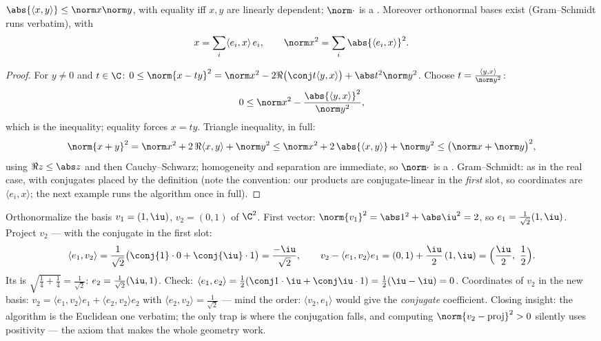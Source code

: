 \begin{theorem}\label{thm:b2:hermitian:cs}
$\abs{\langle x, y\rangle} \leq \norm x \norm y$, with equality iff
$x, y$ are linearly dependent; $\norm\cdot$ is a . Moreover
orthonormal bases exist (Gram--Schmidt runs verbatim), with
\[
x = \sum_i \langle e_i, x\rangle\, e_i,
\qquad
\norm x^2 = \sum_i \abs{\langle e_i, x\rangle}^2 .
\]
\end{theorem}

\begin{proof}
For $y \neq 0$ and $t \in \C$: $0 \leq \norm{x - ty}^2 = \norm x^2
- 2\Re\bigl(\conj t\langle y, x\rangle\bigr) + \abs t^2\norm y^2$.
Choose $t = \frac{\langle y, x\rangle}{\norm y^2}$:
\[
0 \leq \norm x^2 - \frac{\abs{\langle y, x\rangle}^2}{\norm y^2},
\]
which is the inequality; equality forces $x = ty$. Triangle
inequality, in full:
\[
\norm{x + y}^2 = \norm x^2 + 2\,\Re\langle x, y\rangle
+ \norm y^2
\leq \norm x^2 + 2\,\abs{\langle x, y\rangle} + \norm y^2
\leq \bigl(\norm x + \norm y\bigr)^2 ,
\]
using $\Re z \leq \abs z$ and then Cauchy--Schwarz; homogeneity
and separation are immediate, so $\norm\cdot$ is a .
Gram--Schmidt: as in the real case, with conjugates
placed by the definition (note the convention: our products are
conjugate-linear in the \emph{first} slot, so coordinates are
$\langle e_i, x\rangle$; the next example runs the algorithm
once in full).
\end{proof}

\begin{example}\label{ex:b2:hermitian:gramschmidt}
Orthonormalize the basis $v_1 = (1, \iu)$, $v_2 = (0, 1)$ of
$\C^2$. First vector: $\norm{v_1}^2 = \abs1^2 + \abs\iu^2 = 2$,
so $e_1 = \frac{1}{\sqrt2}(1, \iu)$. Project $v_2$ --- with the
conjugate in the first slot:
\[
\langle e_1, v_2\rangle
= \frac{1}{\sqrt2}\bigl(\conj{1}\cdot0 +
\conj{\iu}\cdot1\bigr)
= \frac{-\iu}{\sqrt2} ,
\qquad
v_2 - \langle e_1, v_2\rangle e_1
= (0,1) + \frac{\iu}{2}\,(1, \iu)
= \Bigl(\frac\iu2,\ \frac12\Bigr) .
\]
Its  is $\sqrt{\frac14 + \frac14} = \frac{1}{\sqrt2}$:
$e_2 = \frac{1}{\sqrt2}(\iu, 1)$. Check: $\langle e_1,
e_2\rangle = \frac12(\conj1\cdot\iu + \conj\iu\cdot1) =
\frac12(\iu - \iu) = 0$. Coordinates of $v_2$ in the new basis:
$v_2 = \langle e_1, v_2\rangle e_1 + \langle e_2, v_2\rangle
e_2$ with $\langle e_2, v_2\rangle = \frac{1}{\sqrt2}$ ---
mind the order: $\langle v_2, e_1\rangle$ would give the
\emph{conjugate} coefficient. Closing insight: the algorithm is
the Euclidean one verbatim; the only trap is where the
conjugation falls, and computing $\norm{v_2 -
\text{proj}}^2 > 0$ silently uses positivity --- the axiom
that makes the whole geometry work.
\end{example}

